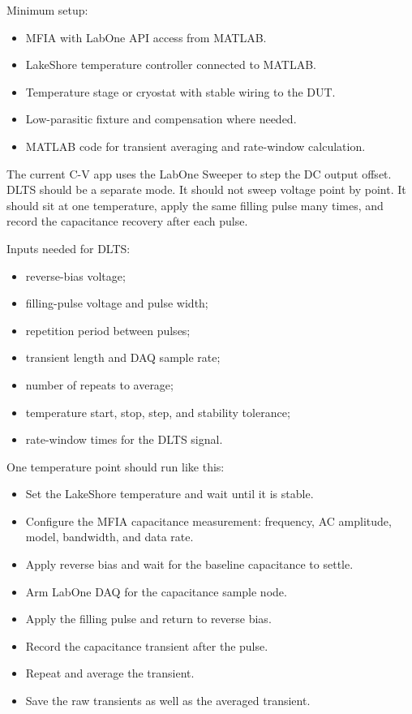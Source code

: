 Minimum setup:
\begin{itemize}
  \item MFIA with LabOne API access from MATLAB.
  \item LakeShore temperature controller connected to MATLAB.
  \item Temperature stage or cryostat with stable wiring to the DUT.
  \item Low-parasitic fixture and compensation where needed.
  \item MATLAB code for transient averaging and rate-window calculation.
\end{itemize}

The current C-V app uses the LabOne Sweeper to step the DC output offset. DLTS
should be a separate mode. It should not sweep voltage point by point. It should
sit at one temperature, apply the same filling pulse many times, and record the
capacitance recovery after each pulse.

Inputs needed for DLTS:
\begin{itemize}
  \item reverse-bias voltage;
  \item filling-pulse voltage and pulse width;
  \item repetition period between pulses;
  \item transient length and DAQ sample rate;
  \item number of repeats to average;
  \item temperature start, stop, step, and stability tolerance;
  \item rate-window times for the DLTS signal.
\end{itemize}

One temperature point should run like this:
\begin{itemize}
  \item Set the LakeShore temperature and wait until it is stable.
  \item Configure the MFIA capacitance measurement: frequency, AC amplitude,
  model, bandwidth, and data rate.
  \item Apply reverse bias and wait for the baseline capacitance to settle.
  \item Arm LabOne DAQ for the capacitance sample node.
  \item Apply the filling pulse and return to reverse bias.
  \item Record the capacitance transient after the pulse.
  \item Repeat and average the transient.
  \item Save the raw transients as well as the averaged transient.
\end{itemize}

